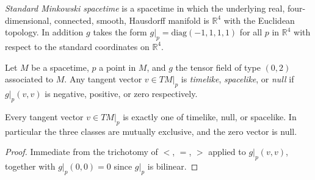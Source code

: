\begin{definition}
    \label{def:standard-minkowski-spacetime}
    \leanok
    \textit{Standard Minkowski spacetime} is a spacetime in which the underlying real, four-dimensional, connected, smooth, Hausdorff manifold is $\mathbb{R}^4$ with the Euclidean topology. In addition $g$ takes the form $g|_p=\text{diag}(-1,1,1,1)$ for all $p$ in $\mathbb{R}^4$ with respect to the standard coordinates on $\mathbb{R}^4$.
\end{definition}

\begin{definition}
    \label{def:timelike-spacelike-null-vectors}
    \leanok
    Let $M$ be a spacetime, $p$ a point in $M$, and $g$ the tensor field of type $(0,2)$ associated to $M$. Any tangent vector $v \in TM|_p$ is \textit{timelike}, \textit{spacelike}, or \textit{null} if $g|_p(v,v)$ is negative, positive, or zero respectively.
\end{definition}

\begin{lemma}
    \label{lmm:causal-classification}
    \leanok
    Every tangent vector $v \in TM|_p$ is exactly one of timelike, null, or spacelike. In particular the three classes are mutually exclusive, and the zero vector is null.
\end{lemma}
\begin{proof}
    \leanok
    Immediate from the trichotomy of $<$, $=$, $>$ applied to $g|_p(v,v)$, together with $g|_p(0,0) = 0$ since $g|_p$ is bilinear.
\end{proof}

